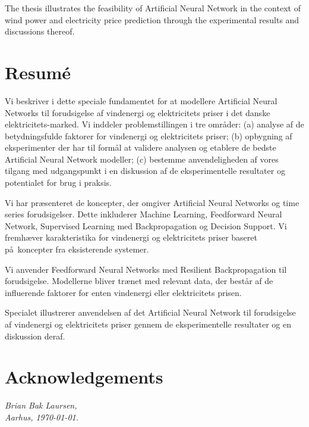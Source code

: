 \documentclass[twoside,11pt,openright]{report}
\begin{document}
The thesis illustrates the feasibility of Artificial Neural Network in the context of wind power and electricity price prediction through the experimental results and discussions thereof.

\chapter*{Resum\'e}

Vi beskriver i dette speciale fundamentet for at modellere Artificial Neural Networks til forudsigelse af vindenergi og elektricitets priser i det danske elektricitets-marked. Vi inddeler problemstillingen i tre omr\aa der: (a) analyse af de betydningsfulde faktorer for vindenergi og elektricitets priser; (b) opbygning af eksperimenter der har til form\aa l at validere analysen og etablere de bedste Artificial Neural Network modeller; (c) bestemme anvendeligheden af vores tilgang med udgangspunkt i en diskussion af de eksperimentelle resultater og potentialet for brug i praksis.

Vi har pr\ae senteret de koncepter, der omgiver Artificial Neural Networks og time series forudsigelser. Dette inkluderer Machine Learning, Feedforward Neural Network, Supervised Learning med Backpropagation og Decision Support. Vi fremh\ae ver karakteristika for vindenergi og elektricitets priser baseret p\aa ~koncepter fra eksisterende systemer.

Vi anvender Feedforward Neural Networks med Resilient Backpropagation til forudsigelse. Modellerne bliver tr\ae net med relevant data, der best\aa r af de influerende faktorer for enten vindenergi eller elektricitets prisen.

Specialet illustrerer anvendelsen af det Artificial Neural Network til forudsigelse af vindenergi og elektricitets priser gennem de eksperimentelle resultater og en diskussion deraf. 

\chapter*{Acknowledgements}

\todo{\dots}

\vspace{2ex}
\begin{flushright}
  \emph{Brian Bak Laursen,}\\
  \emph{Aarhus, \today.}
\end{flushright}
\end{document}

